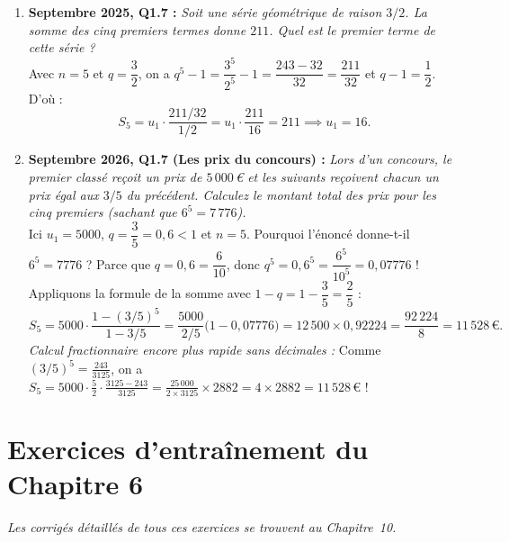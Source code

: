 \begin{exemple}
\begin{enumerate}
    \item \textbf{Septembre 2025, Q1.7 :} \emph{Soit une série géométrique de raison $3/2$. La somme des cinq premiers termes donne $211$. Quel est le premier terme de cette série ?}\\
    Avec $n = 5$ et $q = \dfrac{3}{2}$, on a $q^5 - 1 = \dfrac{3^5}{2^5} - 1 = \dfrac{243 - 32}{32} = \dfrac{211}{32}$ et $q - 1 = \dfrac{1}{2}$. D'où :
    \[
        S_5 = u_1 \cdot \frac{211 / 32}{1 / 2} = u_1 \cdot \frac{211}{16} = 211 \implies \boxed{u_1 = 16}.
    \]

    \item \textbf{Septembre 2026, Q1.7 (Les prix du concours) :} \emph{Lors d'un concours, le premier classé reçoit un prix de $5\,000$\,€ et les suivants reçoivent chacun un prix égal aux $3/5$ du précédent. Calculez le montant total des prix pour les cinq premiers (sachant que $6^5 = 7\,776$).}\\
    Ici $u_1 = 5000$, $q = \dfrac{3}{5} = 0,6 < 1$ et $n = 5$. Pourquoi l'énoncé donne-t-il $6^5 = 7776$ ? Parce que $q = 0,6 = \dfrac{6}{10}$, donc $q^5 = 0,6^5 = \dfrac{6^5}{10^5} = 0,07776$ !
    Appliquons la formule de la somme avec $1 - q = 1 - \dfrac{3}{5} = \dfrac{2}{5}$ :
    \[
        S_5 = 5000 \cdot \frac{1 - (3/5)^5}{1 - 3/5} = \frac{5000}{2/5}\bigl(1 - 0,07776\bigr) = 12\,500 \times 0,92224 = \frac{92\,224}{8} = \boxed{11\,528\,\text{€}}.
    \]
    \emph{Calcul fractionnaire encore plus rapide sans décimales :} Comme $(3/5)^5 = \frac{243}{3125}$, on a $S_5 = 5000 \cdot \frac{5}{2} \cdot \frac{3125 - 243}{3125} = \frac{25\,000}{2 \times 3125} \times 2882 = 4 \times 2882 = 11\,528$\,€ !
\end{enumerate}
\end{exemple}

\section{Exercices d'entraînement du Chapitre 6}

\emph{Les corrigés détaillés de tous ces exercices se trouvent au Chapitre~10.}

